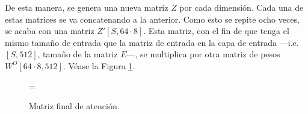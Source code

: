 De esta manera, se genera una nueva matriz $Z$ por cada dimensión. Cada una de estas matrices se va concatenando a la anterior. Como esto se repite ocho veces, se acaba con una matriz $Z'[S, 64\cdot 8]$. Esta matriz, con el fin de que tenga el mismo tamaño de entrada que la matriz de entrada en la  capa de entrada ---i.e. $[S,512]$, tamaño de la matriz $E$---, se multiplica por otra matriz de pesos $W^O[64 \cdot 8,512]$. Véase la Figura \ref{final_mult_head}.

\bigskip

\begin{figure}[H]
    \centering
    \quad \raisebox{0.5cm}{$\times$} \quad %
    \qquad \raisebox{0.5cm}= \qquad %
    \caption{Matriz final de atención.}
    \label{final_mult_head}
\end{figure}

